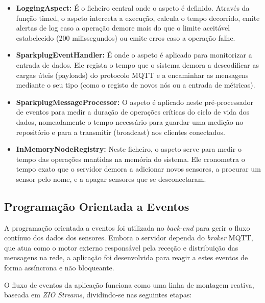 \begin{itemize}
	\item \textbf{LoggingAspect:} É o ficheiro central onde o aspeto é definido. Através da função timed, o aspeto interceta a execução, calcula o tempo decorrido, emite alertas de log caso a operação demore mais do que o limite aceitável estabelecido (200 milissegundos) ou emite erros caso a operação falhe.
	
	\item \textbf{SparkplugEventHandler: } É onde o aspeto é aplicado para monitorizar a entrada de dados. Ele regista o tempo que o sistema demora a descodificar as cargas úteis (payloads) do protocolo MQTT e a encaminhar as mensagens mediante o seu tipo (como o registo de novos nós ou a entrada de métricas).
	
	\item \textbf{SparkplugMessageProcessor:} O aspeto é aplicado neste pré-processador de eventos para medir a duração de operações críticas do ciclo de vida dos dados, nomeadamente o tempo necessário para guardar uma medição no repositório e para a transmitir (broadcast) aos clientes conectados.
	
	\item \textbf{InMemoryNodeRegistry:} Neste ficheiro, o aspeto serve para medir o tempo das operações mantidas na memória do sistema. Ele cronometra o tempo exato que o servidor demora a adicionar novos sensores, a procurar um sensor pelo nome, e a apagar sensores que se desconectaram.
\end{itemize}


\subsection{Programação Orientada a Eventos}

A programação orientada a eventos foi utilizada no \textit{back-end} para gerir o fluxo contínuo dos dados dos sensores. Embora o servidor dependa do \textit{broker} MQTT, que atua como o motor externo responsável pela receção e distribuição das mensagens na rede, a aplicação foi desenvolvida para reagir a estes eventos de forma assíncrona e não bloqueante.

O fluxo de eventos da aplicação funciona como uma linha de montagem reativa, baseada em \textit{ZIO Streams}, dividindo-se nas seguintes etapas:


